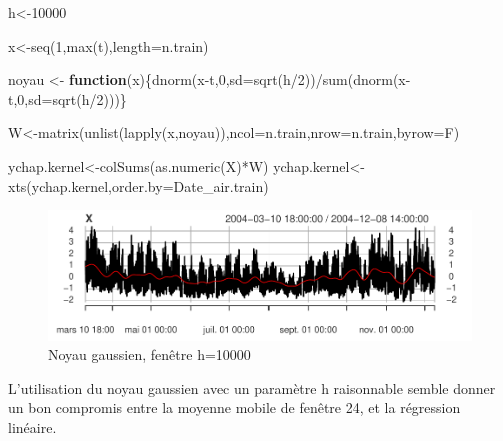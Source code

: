 \documentclass[
]{article}
\newenvironment{Shaded}{\begin{snugshade}}{\end{snugshade}}
\newcommand{\AttributeTok}[1]{\textcolor[rgb]{0.77,0.63,0.00}{#1}}
\newcommand{\ControlFlowTok}[1]{\textcolor[rgb]{0.13,0.29,0.53}{\textbf{#1}}}
\newcommand{\DecValTok}[1]{\textcolor[rgb]{0.00,0.00,0.81}{#1}}
\newcommand{\FunctionTok}[1]{\textcolor[rgb]{0.00,0.00,0.00}{#1}}
\newcommand{\NormalTok}[1]{#1}
\newcommand{\OtherTok}[1]{\textcolor[rgb]{0.56,0.35,0.01}{#1}}
\newcommand{\SpecialCharTok}[1]{\textcolor[rgb]{0.00,0.00,0.00}{#1}}
\begin{document}
\begin{Shaded}
\begin{Highlighting}[]
\NormalTok{h}\OtherTok{\textless{}{-}}\DecValTok{10000}

\NormalTok{x}\OtherTok{\textless{}{-}}\FunctionTok{seq}\NormalTok{(}\DecValTok{1}\NormalTok{,}\FunctionTok{max}\NormalTok{(t),}\AttributeTok{length=}\NormalTok{n.train)}

\NormalTok{noyau }\OtherTok{\textless{}{-}} \ControlFlowTok{function}\NormalTok{(x)\{}\FunctionTok{dnorm}\NormalTok{(x}\SpecialCharTok{{-}}\NormalTok{t,}\DecValTok{0}\NormalTok{,}\AttributeTok{sd=}\FunctionTok{sqrt}\NormalTok{(h}\SpecialCharTok{/}\DecValTok{2}\NormalTok{))}\SpecialCharTok{/}\FunctionTok{sum}\NormalTok{(}\FunctionTok{dnorm}\NormalTok{(x}\SpecialCharTok{{-}}\NormalTok{t,}\DecValTok{0}\NormalTok{,}\AttributeTok{sd=}\FunctionTok{sqrt}\NormalTok{(h}\SpecialCharTok{/}\DecValTok{2}\NormalTok{)))\}}

\NormalTok{W}\OtherTok{\textless{}{-}}\FunctionTok{matrix}\NormalTok{(}\FunctionTok{unlist}\NormalTok{(}\FunctionTok{lapply}\NormalTok{(x,noyau)),}\AttributeTok{ncol=}\NormalTok{n.train,}\AttributeTok{nrow=}\NormalTok{n.train,}\AttributeTok{byrow=}\NormalTok{F)}

\NormalTok{ychap.kernel}\OtherTok{\textless{}{-}}\FunctionTok{colSums}\NormalTok{(}\FunctionTok{as.numeric}\NormalTok{(X)}\SpecialCharTok{*}\NormalTok{W)}
\NormalTok{ychap.kernel}\OtherTok{\textless{}{-}}\FunctionTok{xts}\NormalTok{(ychap.kernel,}\AttributeTok{order.by=}\NormalTok{Date\_air.train)}
\end{Highlighting}
\end{Shaded}

\begin{figure}

{\centering \includegraphics{STA202_report_files/figure-latex/kernel-1} 

}

\caption{\label{fig:kernel} Noyau gaussien, fenêtre h=10000}\label{fig:kernel}
\end{figure}

L'utilisation du noyau gaussien avec un paramètre h raisonnable semble
donner un bon compromis entre la moyenne mobile de fenêtre 24, et la
régression linéaire.
\end{document}
